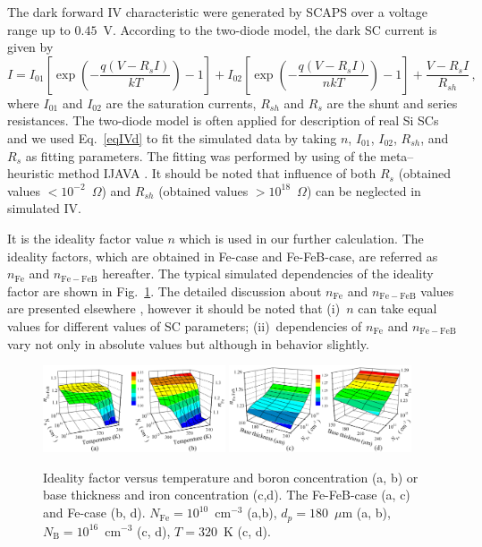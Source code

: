 \documentclass[a4paper,fleqn]{cas-sc}
\begin{document}
The dark forward IV characteristic were generated by SCAPS over a voltage range up to $0.45$~V.
According to the two-diode model, the dark SC current is given by \citep{Breitenstein2013}
\begin{equation}
\label{eqIVd}
    I=I_{01}\left[\exp\left(-\frac{q(V-R_sI)}{kT}\right)-1\right]
      + I_{02}\left[\exp\left(-\frac{q(V-R_sI)}{nkT}\right)-1\right]
      +\frac{V-R_sI}{R_{sh}}\,,
\end{equation}
where
$I_{01}$ and $I_{02}$ are the saturation currents,
$R_{sh}$ and $R_s$ are the shunt and series resistances.
The two-diode model is often applied for description of real Si SCs
and we used Eq.~\ref{eqIVd} to fit the simulated data by taking $n$, $I_{01}$, $I_{02}$,
$R_{sh}$, and $R_s$ as fitting parameters.
The fitting was performed by using of the meta--heuristic method IJAVA \cite{IJAVA}.
It should be noted that influence of both $R_s$ (obtained values $<10^{-2}$~$\Omega$) and $R_{sh}$
(obtained values $>10^{18}$~$\Omega$) can be neglected in simulated IV.

It is the ideality factor value $n$ which is used in our further calculation.
The ideality factors, which are obtained in  Fe-case and Fe-FeB-case,
are referred as  $n_\mathrm{Fe}$ and $n_\mathrm{Fe-FeB}$ hereafter.
The typical simulated dependencies of  the ideality factor are shown in Fig.~\ref{fig_nValues}.
The detailed discussion about $n_\mathrm{Fe}$ and $n_\mathrm{Fe-FeB}$  values are presented elsewhere \cite{OlikhJPS},
however it should be noted that
(i)~$n$ can take equal values for different  values of SC parameters;
(ii)~dependencies of $n_\mathrm{Fe}$ and $n_\mathrm{Fe-FeB}$ vary not only in absolute values but although in behavior slightly.


\begin{figure}[t]
\centering
\includegraphics[width=0.48\textwidth]{Fig1a}
\includegraphics[width=0.48\textwidth]{Fig1b}
\caption{Ideality factor versus temperature and boron concentration (a, b)
or base thickness and iron concentration (c,d).
The Fe-FeB-case (a, c) and Fe-case (b, d).
$N_\mathrm{Fe}=10^{10}$~cm$^{-3}$ (a,b),
$d_p=180$~$\mu$m (a, b),
$N_\mathrm{B}=10^{16}$~cm$^{-3}$ (c, d),
$T=320$~K (c, d).
}
\label{fig_nValues}
\end{figure}
\end{document}

